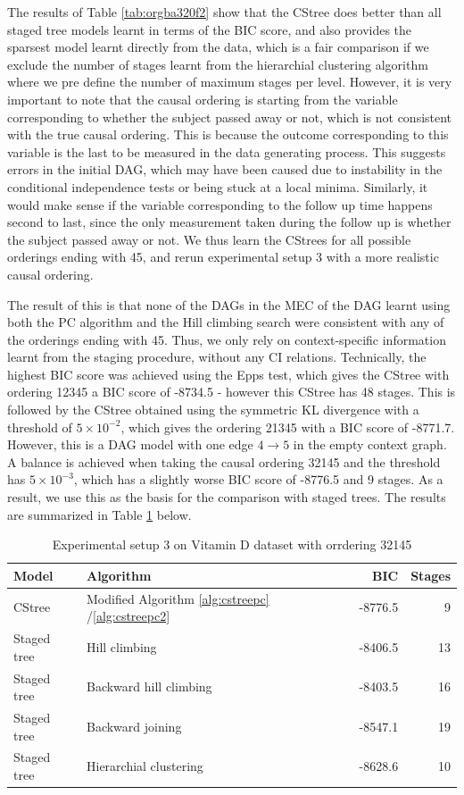 \documentclass{tufte-book}
\begin{document}
The results of Table \ref{tab:orgba320f2} show that the CStree does better than all staged tree models learnt in terms of the BIC score, and also provides the sparsest model learnt directly from the data, which is a fair comparison if we exclude the number of stages learnt from the hierarchial clustering algorithm where we pre define the number of maximum stages per level. However, it is very important to note that the causal ordering is starting from the variable corresponding to whether the subject passed away or not, which is not consistent with the true causal ordering. This is because the outcome corresponding to this variable is the last to be measured in the data generating process. This suggests errors in the initial DAG, which may have been caused due to instability in the conditional independence tests or being stuck at a local minima. Similarly, it would make sense if the variable corresponding to the follow up time happens second to last, since the only measurement taken during the follow up is whether the subject passed away or not. We thus learn the CStrees for all possible orderings ending with 45, and rerun experimental setup 3 with a more realistic causal ordering.

The result of this is that none of the DAGs in the MEC of the DAG learnt using both the PC algorithm and the Hill climbing search were consistent with any of the orderings ending with 45. Thus, we only rely on context-specific information learnt from the staging procedure, without any CI relations. Technically, the highest BIC score was achieved using the Epps test, which gives the CStree with ordering 12345 a BIC score of -8734.5 - however this CStree has 48 stages. This is followed by the CStree obtained using the symmetric KL divergence with a threshold of \(5 \times 10^{-2}\), which gives the ordering 21345 with a BIC score of -8771.7. However, this is a DAG model with one edge \(4 \rightarrow 5\) in the empty context graph. A balance is achieved when taking the causal ordering 32145 and the threshold has \(5 \times 10^{-3}\), which has a slightly worse BIC score of -8776.5 and 9 stages. As a result, we use this as the basis for the comparison with staged trees. The results are summarized in Table \ref{tab:org1c3b84f} below.


\begin{table}[htbp]
\caption{\label{tab:org1c3b84f}Experimental setup 3 on Vitamin D dataset with orrdering 32145}
\centering
\begin{tabular}{l|l|r|r}
\hline
Model & Algorithm & BIC & Stages\\
\hline
CStree & Modified Algorithm \ref{alg:cstreepc} /\ref{alg:cstreepc2} & -8776.5 & 9\\
Staged tree & Hill climbing & -8406.5 & 13\\
Staged tree & Backward hill climbing & -8403.5 & 16\\
Staged tree & Backward joining & -8547.1 & 19\\
Staged tree & Hierarchial clustering & -8628.6 & 10\\
\end{tabular}
\end{table}
\end{document}

